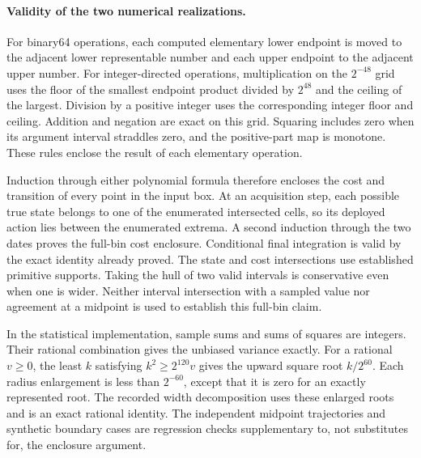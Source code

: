 \paragraph{Validity of the two numerical realizations.}
For binary64 operations, each computed elementary lower endpoint is moved to the adjacent lower representable number and each upper endpoint to the adjacent upper number. For integer-directed operations, multiplication on the $2^{-48}$ grid uses the floor of the smallest endpoint product divided by $2^{48}$ and the ceiling of the largest. Division by a positive integer uses the corresponding integer floor and ceiling. Addition and negation are exact on this grid. Squaring includes zero when its argument interval straddles zero, and the positive-part map is monotone. These rules enclose the result of each elementary operation.

Induction through either polynomial formula therefore encloses the cost and transition of every point in the input box. At an acquisition step, each possible true state belongs to one of the enumerated intersected cells, so its deployed action lies between the enumerated extrema. A second induction through the two dates proves the full-bin cost enclosure. Conditional final integration is valid by the exact identity already proved. The state and cost intersections use established primitive supports. Taking the hull of two valid intervals is conservative even when one is wider. Neither interval intersection with a sampled value nor agreement at a midpoint is used to establish this full-bin claim.

In the statistical implementation, sample sums and sums of squares are integers. Their rational combination gives the unbiased variance exactly. For a rational $v\ge0$, the least $k$ satisfying $k^2\ge2^{120}v$ gives the upward square root $k/2^{60}$. Each radius enlargement is less than $2^{-60}$, except that it is zero for an exactly represented root. The recorded width decomposition uses these enlarged roots and is an exact rational identity. The independent midpoint trajectories and synthetic boundary cases are regression checks supplementary to, not substitutes for, the enclosure argument.
